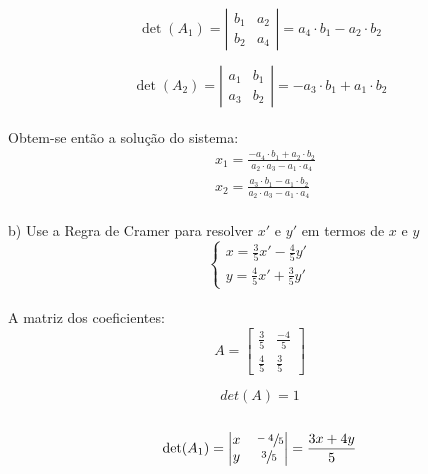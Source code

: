 \[
    \det(A_1) =
    \left|\begin{matrix}
        b_1 & a_2 \\
        b_2 & a_4
    \end{matrix}\right|
    =a_4\cdot b_1-a_2\cdot b_2
\]

\[
    \det(A_2) =
    \left|\begin{matrix}
        a_1 & b_1 \\
        a_3 & b_2
    \end{matrix}\right|
    =-a_3\cdot b_1+a_1\cdot b_2
\]
\\

Obtem-se então a solução do sistema:
\\

\begin{equation}
    \begin{aligned}
         & x_1 = \frac{-a_4\cdot b_1+a_2\cdot b_2}{a_2\cdot a_3-a_1\cdot a_4} \\
         & x_2 = \frac{a_3\cdot b_1-a_1\cdot b_2}{a_2\cdot a_3-a_1\cdot a_4}
    \end{aligned}
\end{equation}
\\

b) Use a Regra de Cramer para resolver $x'$ e $y'$ em termos de $x$ e $y$
\\


\[
    \begin{cases}
        x= \frac{3}{5}x' -\frac{4}{5}y' \\
        y = \frac{4}{5}x'  +\frac{3}{5}y'
    \end{cases}
\]
\\

A matriz dos coeficientes:
\\

\[
    A=
    \begin{bmatrix}
        \frac{3}{5} & \frac{-4}{5} \\
        \frac{4}{5} & \frac{3}{5}
    \end{bmatrix}
\]

\[
    det(A)=1
\]
\\

\[
    \det(A_1) =
    \left|\begin{matrix}
        x & \sfrac{-4}{5} \\
        y & \sfrac{3}{5}
    \end{matrix}\right|
    = \frac{3x+4y}{5}
\]
\\


